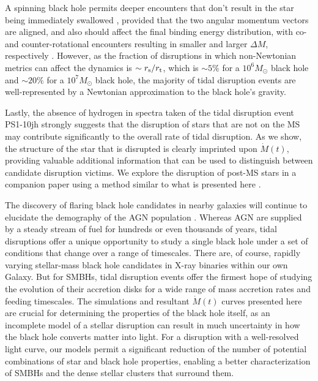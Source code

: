 \documentclass[twocolumn]{emulateapj}
\newcommand{\md}{\dot{M}\left(t\right)}
\newcommand{\msun}{M_{\odot}}
\begin{document}
A spinning black hole permits deeper encounters that don't result in the star being immediately swallowed \citep{Kesden:2012cn}, provided that the two angular momentum vectors are aligned, and also should affect the final binding energy distribution, with co- and counter-rotational encounters resulting in smaller and larger $\Delta M$, respectively \citep{Diener:1997kw,Ivanov:2006fe,Kesden:2012kv}. However, as the fraction of disruptions in which non-Newtonian metrics can affect the dynamics is $\sim r_{\rm s}/r_{\rm t}$, which is $\sim 5\%$ for a $10^{6} \msun$ black hole and $\sim 20\%$ for a $10^{7} \msun$ black hole, the majority of tidal disruption events are well-represented by a Newtonian approximation to the black hole's gravity.

Lastly, the absence of hydrogen in spectra taken of the tidal disruption event PS1-10jh \citep{Gezari:2012fk} strongly suggests that the disruption of stars that are not on the MS may contribute significantly to the overall rate of tidal disruption. As we show, the structure of the star that is disrupted is clearly imprinted upon $\md$, providing valuable additional information that can be used to distinguish between candidate disruption victims. We explore the disruption of post-MS stars in a companion paper using a method similar to what is presented here \citep{MacLeod:2012cd}.

The discovery of flaring black hole candidates in nearby galaxies  will continue to elucidate the demography of the AGN population \citep{DeColle:2012bq}. Whereas AGN are supplied by a steady stream of fuel for hundreds or even thousands of years, tidal disruptions offer a unique opportunity to study a single black hole under a set of conditions that change over a range of timescales. There are, of course, rapidly varying stellar-mass black hole candidates in X-ray binaries within our own Galaxy. But for SMBHs, tidal disruption events offer the firmest hope of studying the evolution of their accretion disks for a wide range of mass accretion rates and feeding timescales.  The simulations and resultant $\md$ curves presented here are crucial for determining the properties of the black hole itself, as an incomplete model of a stellar disruption can result in much uncertainty in how the black hole converts matter into light. For a disruption with a well-resolved light curve, our models permit a significant reduction of the number of potential combinations of star and black hole properties, enabling a better characterization of SMBHs and the dense stellar clusters that surround them.
\end{document}
